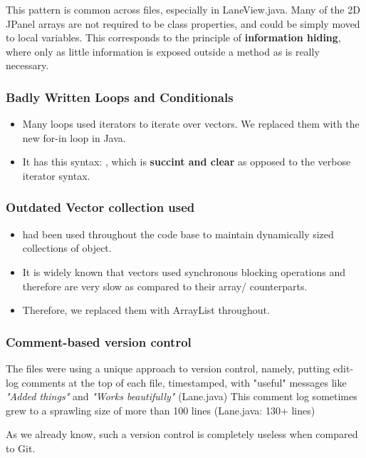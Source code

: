 This pattern is common across files, especially in LaneView.java. Many of the 2D JPanel arrays are not required to be class properties, and could be simply moved to local variables. This corresponds to the principle of \textbf{information hiding}, where only as little information is exposed outside a method as is really necessary.

\subsubsection{Badly Written Loops and Conditionals}

\begin{itemize}
	\item Many loops used iterators to iterate over vectors. We replaced them with the new for-in loop in Java.
	\item It has this syntax: , which is \textbf{succint and clear} as opposed to the verbose iterator syntax.
\end{itemize}

\subsubsection{Outdated Vector collection used}

\begin{itemize}
	\item {} had been used throughout the code base to maintain dynamically sized collections of object.
	\item It is widely known that vectors used synchronous blocking operations and therefore are very slow as compared to their array/ counterparts.
	\item Therefore, we replaced them with ArrayList throughout.
\end{itemize}

\subsubsection{Comment-based version control}

The files were using a unique approach to version control, namely, putting edit-log comments at the top of each file, timestamped, with "useful" messages like \textit{"Added things"} and \textit{"Works beautifully"} (\textrm{Lane.java}) This comment log sometimes grew to a sprawling size of more than 100 lines (Lane.java: 130+ lines)

As we already know, such a version control is completely useless when compared to Git.

